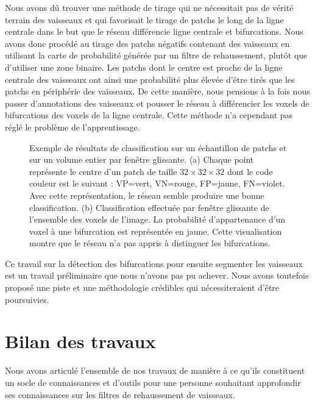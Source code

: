 Nous avons dû trouver une méthode de tirage qui ne nécessitait pas de vérité terrain des vaisseaux et qui favorisait le tirage de patchs le long de la ligne centrale dans le but que le réseau différencie ligne centrale et bifurcations. Nous avons donc procédé au tirage des patchs négatifs contenant des vaisseaux en utilisant la carte de probabilité générée par un filtre de rehaussement, plutôt que d'utiliser une zone binaire. Les patchs dont le centre est proche de la ligne centrale des vaisseaux ont ainsi une probabilité plus élevée d'être tirés que les patchs en périphérie des vaisseaux. De cette manière, nous pensions à la fois nous passer d'annotations des vaisseaux et pousser le réseau à différencier les voxels de bifurcations des voxels de la ligne centrale. Cette méthode n'a cependant pas réglé le problème de l'apprentissage.
\begin{figure}[!ht]
    \captionsetup[subfigure]{justification=centering}
    \centering
    \begin{subfigure}{0.48\textwidth}
        \caption{}
    \end{subfigure}
    \begin{subfigure}{0.48\textwidth}
    \caption{}
    \end{subfigure}
    \caption{Exemple de résultats de classification sur un échantillon de patchs et sur un volume entier par fenêtre glissante. (a) Chaque point représente le centre d'un patch de taille $32 \times 32 \times 32$ dont le code couleur est le suivant : VP=vert, VN=rouge, FP=jaune, FN=violet. Avec cette représentation, le réseau semble produire une bonne classification. (b) Classification effectuée par fenêtre glissante de l'ensemble des voxels de l'image. La probabilité d'appartenance d'un voxel à une bifurcation est représentée en jaune. Cette visualisation montre que le réseau n'a pas appris à distinguer les bifurcations.}
    \label{fig:inference_patches_vs_sliding_window}
\end{figure}

Ce travail sur la détection des bifurcations pour ensuite segmenter les vaisseaux est un travail préliminaire que nous n'avons pas pu achever. Nous avons toutefois proposé une piste et une méthodologie crédibles qui nécessiteraient d'être poursuivies.
\section{ Bilan des travaux}
Nous avons articulé l'ensemble de nos travaux de manière à ce qu'ils constituent un socle de connaissances et d'outils pour une personne souhaitant approfondir ses connaissances sur les filtres de rehaussement de vaisseaux. 

